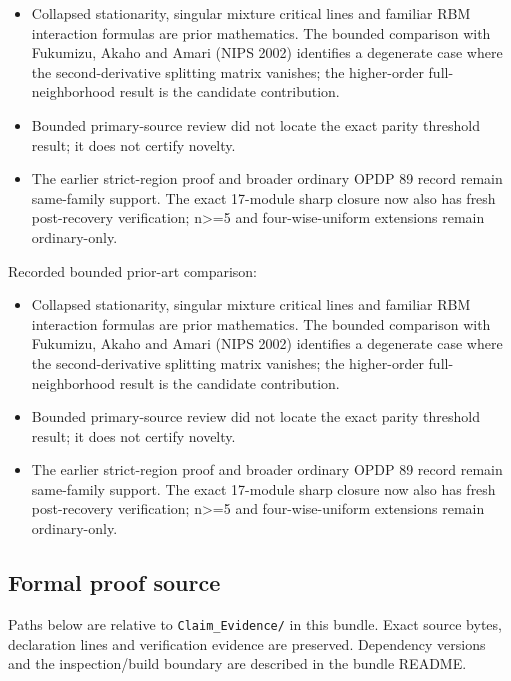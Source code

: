 \documentclass[11pt,a4paper]{article}
\begin{document}
\begin{itemize}
\item Collapsed stationarity, singular mixture critical lines and familiar RBM interaction formulas are prior mathematics. The bounded comparison with Fukumizu, Akaho and Amari (NIPS 2002) identifies a degenerate case where the second-derivative splitting matrix vanishes; the higher-order full-neighborhood result is the candidate contribution.
\end{itemize}
\begin{itemize}
\item Bounded primary-source review did not locate the exact parity threshold result; it does not certify novelty.
\end{itemize}
\begin{itemize}
\item The earlier strict-region proof and broader ordinary OPDP 89 record remain same-family support. The exact 17-module sharp closure now also has fresh post-recovery verification; n>=5 and four-wise-uniform extensions remain ordinary-only.
\end{itemize}
Recorded bounded prior-art comparison:

\begin{itemize}
\item Collapsed stationarity, singular mixture critical lines and familiar RBM interaction formulas are prior mathematics. The bounded comparison with Fukumizu, Akaho and Amari (NIPS 2002) identifies a degenerate case where the second-derivative splitting matrix vanishes; the higher-order full-neighborhood result is the candidate contribution.
\end{itemize}
\begin{itemize}
\item Bounded primary-source review did not locate the exact parity threshold result; it does not certify novelty.
\end{itemize}
\begin{itemize}
\item The earlier strict-region proof and broader ordinary OPDP 89 record remain same-family support. The exact 17-module sharp closure now also has fresh post-recovery verification; n>=5 and four-wise-uniform extensions remain ordinary-only.
\end{itemize}
\subsection{Formal proof source}
Paths below are relative to \texttt{Claim\_Evidence/} in this bundle. Exact source bytes, declaration lines and verification evidence are preserved. Dependency versions and the inspection/build boundary are described in the bundle README.
\end{document}
